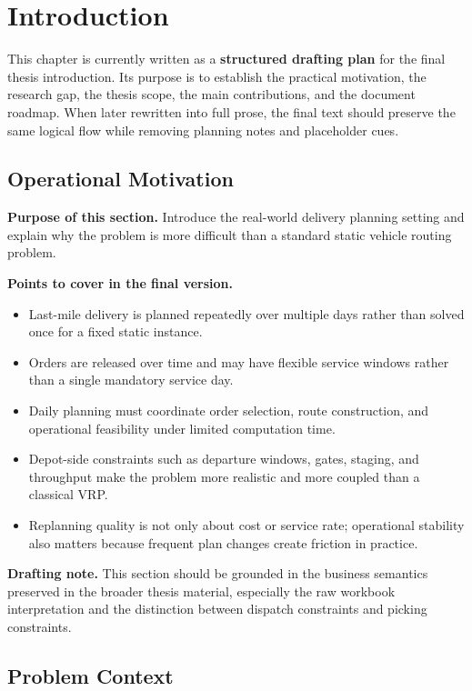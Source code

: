 \chapter{Introduction}
\label{ch:introduction}

This chapter is currently written as a \textbf{structured drafting plan} for the final thesis introduction.
Its purpose is to establish the practical motivation, the research gap, the thesis scope, the main contributions, and the document roadmap.
When later rewritten into full prose, the final text should preserve the same logical flow while removing planning notes and placeholder cues.

\section{Operational Motivation}
\label{sec:intro:motivation}

\textbf{Purpose of this section.}
Introduce the real-world delivery planning setting and explain why the problem is more difficult than a standard static vehicle routing problem.

\textbf{Points to cover in the final version.}
\begin{itemize}
    \item Last-mile delivery is planned repeatedly over multiple days rather than solved once for a fixed static instance.
    \item Orders are released over time and may have flexible service windows rather than a single mandatory service day.
    \item Daily planning must coordinate order selection, route construction, and operational feasibility under limited computation time.
    \item Depot-side constraints such as departure windows, gates, staging, and throughput make the problem more realistic and more coupled than a classical VRP.
    \item Replanning quality is not only about cost or service rate; operational stability also matters because frequent plan changes create friction in practice.
\end{itemize}

\textbf{Drafting note.}
This section should be grounded in the business semantics preserved in the broader thesis material, especially the raw workbook interpretation and the distinction between dispatch constraints and picking constraints.

\section{Problem Context}
\label{sec:intro:context}

